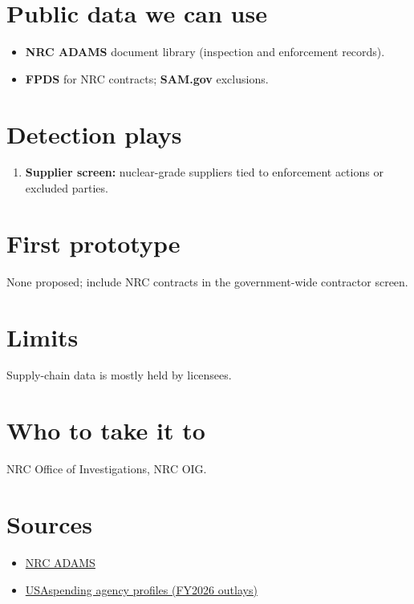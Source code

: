 \documentclass[letterpaper,11pt]{article}
\providecommand{\tightlist}{\setlength{\itemsep}{0pt}\setlength{\parskip}{0pt}}
\begin{document}
\hypertarget{public-data-we-can-use}{%
\section{Public data we can use}\label{public-data-we-can-use}}

\begin{itemize}
\tightlist
\item
  \textbf{NRC ADAMS} document library (inspection and enforcement
  records).
\item
  \textbf{FPDS} for NRC contracts; \textbf{SAM.gov} exclusions.
\end{itemize}

\hypertarget{detection-plays}{%
\section{Detection plays}\label{detection-plays}}

\begin{enumerate}
\def\labelenumi{\arabic{enumi}.}
\tightlist
\item
  \textbf{Supplier screen:} nuclear-grade suppliers tied to enforcement
  actions or excluded parties.
\end{enumerate}

\hypertarget{first-prototype}{%
\section{First prototype}\label{first-prototype}}

None proposed; include NRC contracts in the government-wide contractor
screen.

\hypertarget{limits}{%
\section{Limits}\label{limits}}

Supply-chain data is mostly held by licensees.

\hypertarget{who-to-take-it-to}{%
\section{Who to take it to}\label{who-to-take-it-to}}

NRC Office of Investigations, NRC OIG.

\hypertarget{sources}{%
\section{Sources}\label{sources}}

\begin{itemize}
\tightlist
\item
  \href{https://www.nrc.gov/reading-rm/adams.html}{NRC ADAMS}
\item
  \href{https://www.usaspending.gov/agency}{USAspending agency profiles
  (FY2026 outlays)}
\end{itemize}
\end{document}
